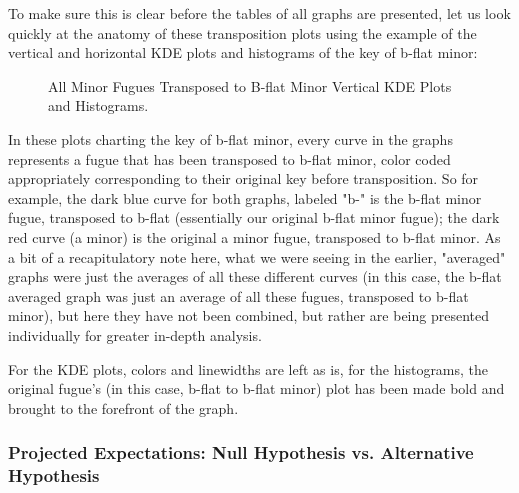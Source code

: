 To make sure this is clear before the tables of all graphs are
presented, let us look quickly at the anatomy of these transposition
plots using the example of the vertical and horizontal KDE plots and
histograms of the key of b-flat minor:


    \begin{center}
    \end{center}
    


\begin{figure}[H]
    \begin{center}
    \caption{All Minor Fugues Transposed to B-flat Minor Vertical KDE Plots and Histograms. }
    \end{center}
\end{figure}
    
    In these plots charting the key of b-flat minor, every curve in the
graphs represents a fugue that has been transposed to b-flat minor,
color coded appropriately corresponding to their original key before
transposition. So for example, the dark blue curve for both graphs,
labeled "b-" is the b-flat minor fugue, transposed to b-flat
(essentially our original b-flat minor fugue); the dark red curve (a
minor) is the original a minor fugue, transposed to b-flat minor. As a
bit of a recapitulatory note here, what we were seeing in the earlier,
"averaged" graphs were just the averages of all these different curves
(in this case, the b-flat averaged graph was just an average of all
these fugues, transposed to b-flat minor), but here they have not been
combined, but rather are being presented individually for greater
in-depth analysis.

For the KDE plots, colors and linewidths are left as is, for the
histograms, the original fugue's (in this case, b-flat to b-flat minor)
plot has been made bold and brought to the forefront of the graph.

\subsubsection{Projected Expectations: Null Hypothesis vs. Alternative
Hypothesis}\label{projected-expectations-null-hypothesis-vs.-alternative-hypothesis}

